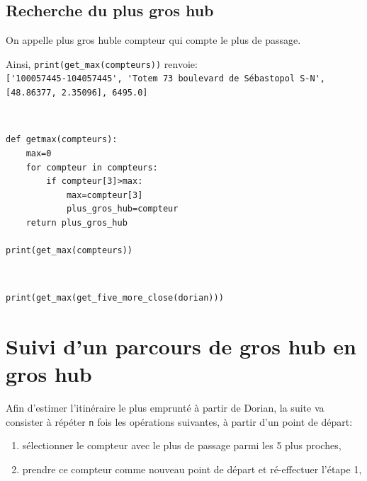 \subsection{Recherche du plus gros hub}

On appelle \og plus gros hub\fg le compteur qui compte le plus de passage.


Ainsi, \verb?print(get_max(compteurs))? renvoie:\\
\verb?['100057445-104057445', 'Totem 73 boulevard de Sébastopol S-N', [48.86377, 2.35096], 6495.0]?

\begin{solution}~\ \\
\begin{verbatim}
def getmax(compteurs):
    max=0
    for compteur in compteurs:
        if compteur[3]>max:
            max=compteur[3]
            plus_gros_hub=compteur
    return plus_gros_hub

print(get_max(compteurs))
\end{verbatim}
\end{solution}


\begin{solution}~\ \\
\begin{verbatim}
print(get_max(get_five_more_close(dorian)))
\end{verbatim}
\end{solution}

\section{Suivi d'un parcours de gros hub en gros hub}

Afin d'estimer l'itinéraire le plus emprunté à partir de Dorian, la suite va consister à
répéter \verb?n? fois les opérations suivantes, à partir d'un point de départ:
\begin{enumerate}
 \item sélectionner le compteur avec le plus de passage parmi les 5 plus proches,
 \item prendre ce compteur comme nouveau point de départ et ré-effectuer l'étape 1,
\end{enumerate}

